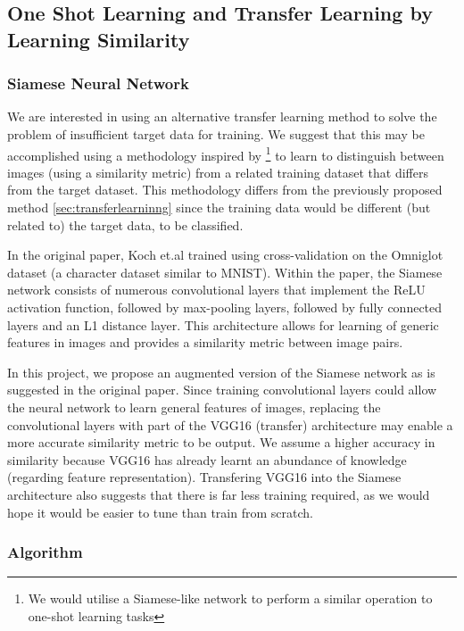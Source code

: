 \documentclass{article}
\begin{document}
\subsection{One Shot Learning and Transfer Learning by Learning Similarity}
\label{sec:oneshot}

\subsubsection{\textbf{Siamese Neural Network}}

We are interested in using an alternative transfer learning method to solve the problem of insufficient target data for training. We suggest that this may be accomplished using a methodology inspired by \cite{koch}\footnote{We would utilise a Siamese-like network to perform a similar operation to one-shot learning tasks} to learn to distinguish between images (using a similarity metric) from a related training dataset that differs from the target dataset. This methodology differs from the previously proposed method \ref{sec:transferlearninng} since the training data would be different (but related to) the target data, to be classified.

In the original paper, Koch et.al trained using cross-validation on the Omniglot dataset (a character dataset similar to MNIST). Within the paper, the Siamese network consists of numerous convolutional layers that implement the ReLU activation function, followed by max-pooling layers, followed by fully connected layers and an L1 distance layer. This architecture allows for learning of generic features in images and provides a similarity metric between image pairs.

In this project, we propose an augmented version of the Siamese network as is suggested in the original paper. Since training convolutional layers could allow the neural network to learn general features of images, replacing the convolutional layers with part of the VGG16 (transfer) architecture may enable a more accurate similarity metric to be output. We assume a higher accuracy in similarity because VGG16 has already learnt an abundance of knowledge (regarding feature representation). Transfering VGG16 into the Siamese architecture also suggests that there is far less training required, as we would hope it would be easier to tune than train from scratch.

\subsubsection{\textbf{Algorithm}}
\end{document}
